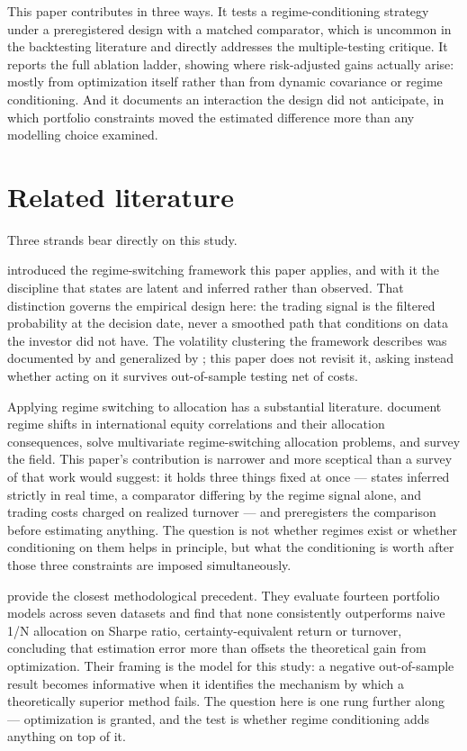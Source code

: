 This paper contributes in three ways. It tests a regime-conditioning
strategy under a preregistered design with a matched comparator, which
is uncommon in the backtesting literature and directly addresses the
multiple-testing critique. It reports the full ablation ladder, showing
where risk-adjusted gains actually arise: mostly from optimization
itself rather than from dynamic covariance or regime conditioning. And
it documents an interaction the design did not anticipate, in which
portfolio constraints moved the estimated difference more than any
modelling choice examined.

\section{Related literature}
\label{sec:literature}

Three strands bear directly on this study.

\citet{hamilton1989} introduced the regime-switching framework this
paper applies, and with it the discipline that states are latent and
inferred rather than observed. That distinction governs the empirical
design here: the trading signal is the filtered probability at the
decision date, never a smoothed path that conditions on data the
investor did not have. The volatility clustering the framework describes
was documented by \citet{engle1982} and generalized by
\citet{bollerslev1986}; this paper does not revisit it, asking instead
whether acting on it survives out-of-sample testing net of costs.

Applying regime switching to allocation has a substantial literature.
\citet{ang2002} document regime shifts in international equity
correlations and their allocation consequences, \citet{guidolin2007}
solve multivariate regime-switching allocation problems, and
\citet{ang2012} survey the field. This paper's contribution is narrower
and more sceptical than a survey of that work would suggest: it holds
three things fixed at once --- states inferred strictly in real time, a
comparator differing by the regime signal alone, and trading costs
charged on realized turnover --- and preregisters the comparison before
estimating anything. The question is not whether regimes exist or
whether conditioning on them helps in principle, but what the
conditioning is worth after those three constraints are imposed
simultaneously.

\citet{demiguel2009} provide the closest methodological precedent. They
evaluate fourteen portfolio models across seven datasets and find that
none consistently outperforms naive 1/N allocation on Sharpe ratio,
certainty-equivalent return or turnover, concluding that estimation
error more than offsets the theoretical gain from optimization. Their
framing is the model for this study: a negative out-of-sample result
becomes informative when it identifies the mechanism by which a
theoretically superior method fails. The question here is one rung
further along --- optimization is granted, and the test is whether
regime conditioning adds anything on top of it.

